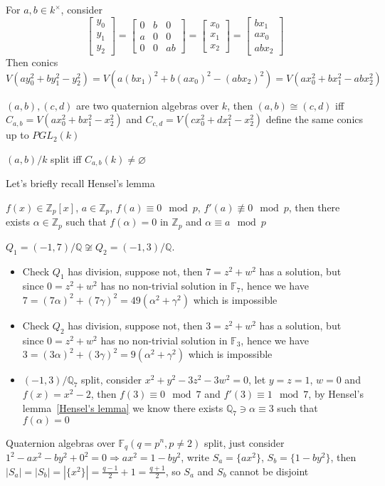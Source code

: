\documentclass[a4paper,10pt]{article}
\begin{document}
For $a,b\in k^\times$, consider
\[
\begin{bmatrix}
y_0\\y_1\\y_2
\end{bmatrix}=\begin{bmatrix}
0&b&0\\
a&0&0\\
0&0&ab
\end{bmatrix}=\begin{bmatrix}
x_0\\x_1\\x_2
\end{bmatrix}=\begin{bmatrix}
bx_1\\ax_0\\abx_2
\end{bmatrix}
\]
Then conics $V(ay_0^2+by_1^2-y_2^2)=V(a(bx_1)^2+b(ax_0)^2-(abx_2)^2)=V(ax_0^2+bx_1^2-abx_2^2)$

\begin{proposition}
$(a,b),(c,d)$ are two quaternion algebras over $k$, then $(a,b)\cong(c,d)$ iff $C_{a,b}=V(ax_0^2+bx_1^2-x_2^2)$ and $C_{c,d}=V(cx_0^2+dx_1^2-x_2^2)$ define the same conics up to $PGL_2(k)$
\end{proposition}

\begin{proposition}
$(a,b)/k$ split iff $C_{a,b}(k)\neq\varnothing$
\end{proposition}

Let's briefly recall Hensel's lemma
\begin{lemma}\label{Hensel's lemma}
$f(x)\in\mathbb Z_p[x]$, $a\in\mathbb Z_p$, $f(a)\equiv0\mod p$, $f'(a)\not\equiv0\mod p$, then there exists $\alpha\in\mathbb Z_p$ such that $f(\alpha)=0$ in $\mathbb Z_p$ and $\alpha\equiv a\mod p$
\end{lemma}

\begin{example}
$Q_1=(-1,7)/\mathbb Q\not\cong Q_2=(-1,3)/\mathbb Q$.
\begin{itemize}
\item Check $Q_1$ has division, suppose not, then $7=z^2+w^2$ has a solution, but since $0=z^2+w^2$ has no non-trivial solution in $\mathbb F_7$, hence we have $7=(7\alpha)^2+(7\gamma)^2=49(\alpha^2+\gamma^2)$ which is impossible
\item Check $Q_2$ has division, suppose not, then $3=z^2+w^2$ has a solution, but since $0=z^2+w^2$ has no non-trivial solution in $\mathbb F_3$, hence we have $3=(3\alpha)^2+(3\gamma)^2=9(\alpha^2+\gamma^2)$ which is impossible
\item $(-1,3)/\mathbb Q_7$ split, consider $x^2+y^2-3z^2-3w^2=0$, let $y=z=1$, $w=0$ and $f(x)=x^2-2$, then $f(3)\equiv0\mod 7$ and $f'(3)\equiv1\mod7$, by Hensel's lemma~\ref{Hensel's lemma} we know there exists $\mathbb Q_7\ni\alpha\equiv3$ such that $f(\alpha)=0$
\end{itemize}
\end{example}

\begin{example}
Quaternion algebras over $\mathbb F_q(q=p^n,p\neq 2)$ split, just consider $1^2-ax^2-by^2+0^2=0\Rightarrow ax^2=1-by^2$, write $S_a=\{ax^2\}$, $S_b=\{1-by^2\}$, then $|S_a|=|S_b|=|\{x^2\}|=\frac{q-1}{2}+1=\frac{q+1}{2}$, so $S_a$ and $S_b$ cannot be disjoint
\end{example}
\end{document}
